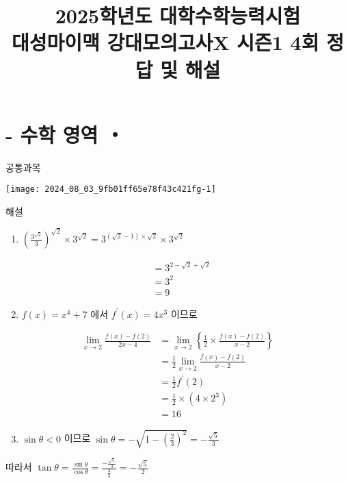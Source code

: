 \documentclass[10pt]{article}
\title{2025학년도 대학수학능력시험 \\
 대성마이맥 강대모의고사X 시즌1 4회 정답 및 해설 }
\author{}
\date{}
\begin{document}
\maketitle
\section*{- 수학 영역 ・}
공통과목

\begin{center}
\texttt{[image: 2024\_08\_03\_9fb01ff65e78f43c421fg-1]}
\end{center}

해설

\begin{enumerate}
  \item \(\left(\frac{3^{\sqrt{2}}}{3}\right)^{\sqrt{2}} \times 3^{\sqrt{2}}=3^{(\sqrt{2}-1) \times \sqrt{2}} \times 3^{\sqrt{2}}\)
\end{enumerate}

\[
\begin{aligned}
& =3^{2-\sqrt{2}+\sqrt{2}} \\
& =3^{2} \\
& =9
\end{aligned}
\]

\begin{enumerate}
  \setcounter{enumi}{1}
  \item \(f(x)=x^{4}+7\) 에서 \(f^{\prime}(x)=4 x^{3}\) 이므로
\end{enumerate}

\[
\begin{aligned}
\lim _{x \rightarrow 2} \frac{f(x)-f(2)}{2 x-4} & =\lim _{x \rightarrow 2}\left\{\frac{1}{2} \times \frac{f(x)-f(2)}{x-2}\right\} \\
& =\frac{1}{2} \lim _{x \rightarrow 2} \frac{f(x)-f(2)}{x-2} \\
& =\frac{1}{2} f^{\prime}(2) \\
& =\frac{1}{2} \times\left(4 \times 2^{3}\right) \\
& =16
\end{aligned}
\]

\begin{enumerate}
  \setcounter{enumi}{2}
  \item \(\sin \theta<0\) 이므로 \(\sin \theta=-\sqrt{1-\left(\frac{2}{3}\right)^{2}}=-\frac{\sqrt{5}}{3}\)
\end{enumerate}

따라서 \(\tan \theta=\frac{\sin \theta}{\cos \theta}=\frac{-\frac{\sqrt{5}}{3}}{\frac{2}{3}}=-\frac{\sqrt{5}}{2}\)
\end{document}
